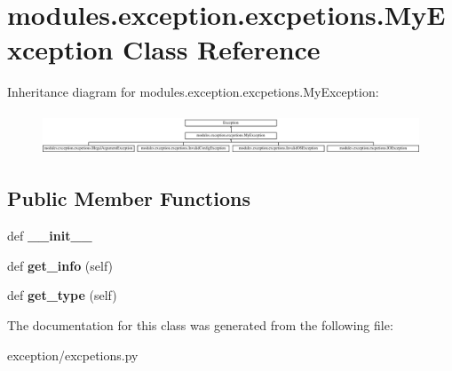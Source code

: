 \hypertarget{classmodules_1_1exception_1_1excpetions_1_1_my_exception}{}\section{modules.\+exception.\+excpetions.\+My\+Exception Class Reference}
\label{classmodules_1_1exception_1_1excpetions_1_1_my_exception}
Inheritance diagram for modules.\+exception.\+excpetions.\+My\+Exception\+:\begin{figure}[H]
\begin{center}
\leavevmode
\includegraphics[height=1.257485cm]{classmodules_1_1exception_1_1excpetions_1_1_my_exception}
\end{center}
\end{figure}
\subsection*{Public Member Functions}
\begin{DoxyCompactItemize}
\item 
\mbox{\label{classmodules_1_1exception_1_1excpetions_1_1_my_exception_aa9a2bd83afa67e6b8515cb9a2f27d2e5}} 
def {\bfseries \+\_\+\+\_\+init\+\_\+\+\_\+}
\item 
\mbox{\label{classmodules_1_1exception_1_1excpetions_1_1_my_exception_a3f7ec639a138862780ee40c36206ea89}} 
def {\bfseries get\+\_\+info} (self)
\item 
\mbox{\label{classmodules_1_1exception_1_1excpetions_1_1_my_exception_aa9751951fe01ee767067d74b3614c30c}} 
def {\bfseries get\+\_\+type} (self)
\end{DoxyCompactItemize}


The documentation for this class was generated from the following file\+:\begin{DoxyCompactItemize}
\item 
exception/excpetions.\+py\end{DoxyCompactItemize}
